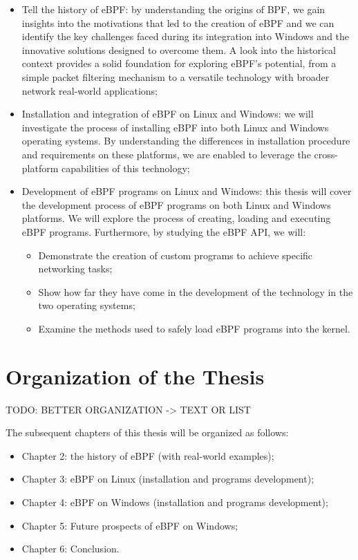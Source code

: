 \begin{itemize}
	\item Tell the history of eBPF: by understanding the origins of BPF, we gain insights into the 		
		motivations that led to the creation of eBPF and we can identify the key challenges faced during its integration into Windows and the innovative solutions designed to overcome them. 
		A look into the historical context provides a solid foundation for exploring eBPF's potential, from a simple packet filtering mechanism to a versatile technology with broader network real-world applications;
	\item Installation and integration of eBPF on Linux and Windows: we will investigate the process of
		installing eBPF into both Linux and Windows operating systems. 
		By understanding the differences in installation procedure and requirements on these platforms, we are enabled to leverage the cross-platform capabilities of this technology;
	\item Development of eBPF programs on Linux and Windows: this thesis will cover the development
		process of eBPF programs on both Linux and Windows platforms. 
		We will explore the process of creating, loading and executing eBPF programs.
		Furthermore, by studying the eBPF API, we will:
		\begin{itemize}
			\item Demonstrate the creation of custom programs to achieve specific networking tasks;
			\item Show how far they have come in the development of the technology in the two operating
				systems;
			\item Examine the methods used to safely load eBPF programs into the kernel. 
		\end{itemize}
\end{itemize}

\section{Organization of the Thesis}

TODO: BETTER ORGANIZATION -> TEXT OR LIST

The subsequent chapters of this thesis will be organized as follows:

\begin{itemize}
	\item Chapter 2: the history of eBPF (with real-world examples);
	\item Chapter 3: eBPF on Linux (installation and programs development);
	\item Chapter 4: eBPF on Windows (installation and programs development);
	\item Chapter 5: Future prospects of eBPF on Windows;
	\item Chapter 6: Conclusion.
\end{itemize}

